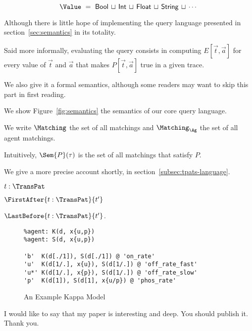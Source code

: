 \[ \Value \ = \ \textsf{Bool} \,\sqcup\, \textsf{Int} \,\sqcup\,
  \textsf{Float} \,\sqcup\, \textsf{String} \,\sqcup\, \cdots \]


Although there is little hope of implementing the query language
presented in section~\ref{sec:semantics} in its totality.

Said more informally, evaluating the query consists in
computing $E[\Vec{t}, \Vec{a}]$ for every value of $\Vec{t}$ and $\Vec{a}$
that makes $P[\Vec{t}, \Vec{a}]$ true in a given trace.

We also give it a formal semantics, although some
readers may want to skip this part in first reading.

We show Figure~\ref{fig:semantics} the semantics of our core query
language.

We write $\Matching$
the set of all matchings and $\Matching_{\Ag}$ the set of all agent matchings.

 Intuitively, $\Sem{P}(\tau)$ is 
the set of all matchings that satisfy $P$.

 We give a more precise
 account shortly, in section~\ref{subsec:tpats-language}.

 \begin{inparaenum}[(i)]
   \item $t:\TransPat$
   \item $\FirstAfter{t:\TransPat}{t'}$
   \item $\LastBefore{t:\TransPat}{t'}$.
 \end{inparaenum}

\begin{figure}
\begin{small}
\begin{verbatim}
%agent: K(d, x{u,p})
%agent: S(d, x{u,p})

'b'  K(d[./1]), S(d[./1]) @ 'on_rate'
'u'  K(d[1/.], x{u}), S(d[1/.]) @ 'off_rate_fast'
'u*' K(d[1/.], x{p}), S(d[1/.]) @ 'off_rate_slow'
'p'  K(d[1]), S(d[1], x{u/p}) @ 'phos_rate'
\end{verbatim}
\end{small}
\caption{An Example Kappa Model}\label{fig:model}
\end{figure}

I would like to say that my paper is interesting and deep. You should
publish it. Thank you.
